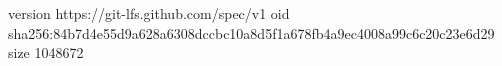 version https://git-lfs.github.com/spec/v1
oid sha256:84b7d4e55d9a628a6308dccbc10a8d5f1a678fb4a9ec4008a99c6c20c23e6d29
size 1048672
